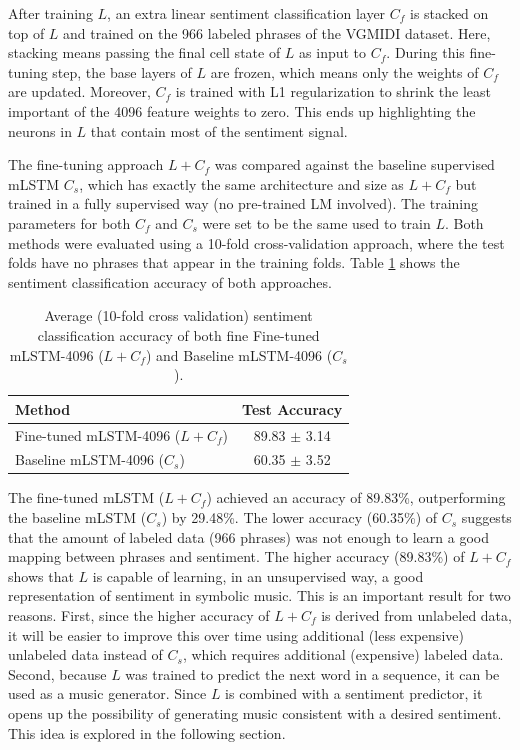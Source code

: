 After training $L$, an extra linear sentiment classification layer $C_f$ is stacked on top of $L$ and trained on the 966 labeled phrases of the VGMIDI dataset. Here, stacking means passing the final cell state of $L$ as input to $C_f$. During this fine-tuning step, the base layers of $L$ are frozen, which means only the weights of $C_f$ are updated. Moreover, $C_f$ is trained with L1 regularization to shrink the least important of the 4096 feature weights to zero. This ends up highlighting the neurons in $L$ that contain most of the sentiment signal.

The fine-tuning approach $L + C_f$ was compared against the baseline supervised mLSTM $C_s$, which has exactly the same architecture and size as $L + C_f$ but trained in a fully supervised way (no pre-trained LM involved).
The training parameters for both $C_f$ and $C_s$ were set to be the same used to train $L$. Both methods were evaluated using a 10-fold cross-validation approach, where the test folds have no phrases that appear in the training folds. Table \ref{tab:sent_anal} shows the sentiment classification accuracy of both approaches.

\begin{table}[!h]
 \begin{center}
 \begin{tabular}{lc}
  \hline
  \textbf{Method} & \textbf{Test Accuracy} \\ \hline
  Fine-tuned mLSTM-4096 ($L + C_f$) & 89.83 $\pm$ 3.14\\
  Baseline mLSTM-4096 ($C_s$) & 60.35 $\pm$ 3.52 \\
  \hline
 \end{tabular}
\end{center}
\caption{Average (10-fold cross validation) sentiment classification accuracy of both fine Fine-tuned mLSTM-4096 ($L + C_f$) and Baseline mLSTM-4096 ($C_s$).}
 \label{tab:sent_anal}
\end{table}

The fine-tuned mLSTM ($L + C_f$) achieved an accuracy of 89.83\%, outperforming the baseline mLSTM ($C_s$) by 29.48\%. The lower accuracy (60.35\%) of $C_s$ suggests that the amount of labeled data (966 phrases) was not enough to learn a good mapping between phrases and sentiment. The higher accuracy (89.83\%) of $L + C_f$ shows that $L$ is capable of learning, in an unsupervised way, a good representation of sentiment in symbolic music. This is an important result for two reasons. First, since the higher accuracy of $L + C_f$ is derived from unlabeled data, it will be easier to improve this over time using additional (less expensive) unlabeled data instead of $C_s$, which requires additional (expensive) labeled data. Second, because $L$ was trained to predict the next word in a sequence, it can be used as a music generator. Since $L$ is combined with a sentiment predictor, it opens up the possibility of generating music consistent with a desired sentiment. This idea is explored in the following section.

